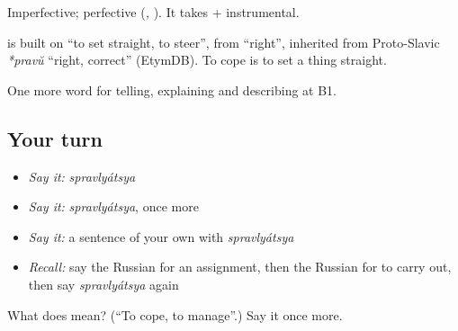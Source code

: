Imperfective; perfective \emph{} (\emph{, }). It takes \emph{} + instrumental.

\begin{cousinweb}
\textbf{} is built on \emph{} \textquotedblleft{}to set straight, to steer\textquotedblright{}, from \emph{} \textquotedblleft{}right\textquotedblright{}, inherited from Proto-Slavic \emph{*pravŭ} \textquotedblleft{}right, correct\textquotedblright{} (EtymDB). To cope is to set a thing straight.
\end{cousinweb}

\begin{grammarlens}[title={What you've built}]
One more word for telling, explaining and describing at B1.
\end{grammarlens}

\subsection*{Your turn}
\begin{itemize}
\raggedright
  \item \emph{Say it:} \emph{spravlyátsya}
  \item \emph{Say it:} \emph{spravlyátsya}, once more
  \item \emph{Say it:} a sentence of your own with \emph{spravlyátsya}
  \item \emph{Recall:} say the Russian for an assignment, then the Russian for to carry out, then say \emph{spravlyátsya} again
\end{itemize}

\begin{tcolorbox}[breakable,colback=teal!4,colframe=teal!35!black,title={Before you move on}]
What does  mean? (\textquotedblleft{}To cope, to manage\textquotedblright{}.) Say it once more.
\end{tcolorbox}
